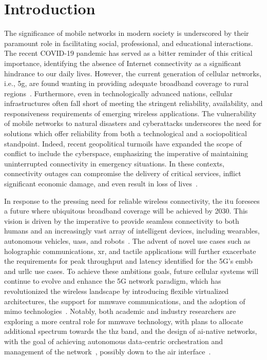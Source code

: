 \chapter{Introduction}

The significance of mobile networks in modern society is underscored by their paramount role in facilitating social, professional, and educational interactions. The recent COVID-19 pandemic has served as a bitter reminder of this critical importance, identifying the absence of Internet connectivity as a significant hindrance to our daily lives.
However, the current generation of cellular networks, i.e., \gls{5g}, are found wanting in providing adequate broadband coverage to rural regions~\cite{yaacoub2020key}. Furthermore, even in technologically advanced nations, cellular infrastructures often fall short of meeting the stringent reliability, availability, and responsiveness requirements of emerging wireless applications. The vulnerability of mobile networks to natural disasters and cyberattacks underscores the need for solutions which offer reliability from both a technological and a sociopolitical standpoint.
Indeed, recent geopolitical turmoils have expanded the scope of conflict to include the cyberspace, emphasizing the imperative of maintaining uninterrupted connectivity in emergency situations. In these contexts, connectivity outages can compromise the delivery of critical services, inflict significant economic damage, and even result in loss of lives~\cite{internet_ukr_afg}.

In response to the pressing need for reliable wireless connectivity, the \gls{itu} foresees a future where ubiquitous broadband coverage will be achieved by 2030. This vision is driven by the imperative to provide seamless connectivity to both humans and an increasingly vast array of intelligent devices, including wearables, autonomous vehicles, \glspl{uas}, and robots~\cite{mozaffari2018beyond}.
The advent of novel use cases such as holographic communications, \gls{xr}, and tactile applications will further exacerbate the requirements for peak throughput and latency identified for the 5G's \gls{embb} and \gls{urllc} use cases. 
To achieve these ambitions goals, future cellular systems will continue to evolve and enhance the 5G network paradigm, which has revolutionized the wireless landscape by introducing flexible virtualized architectures, the support for \gls{mmwave} communications, and the adoption of \gls{mimo} technologies~\cite{ghosh20195g}. 
Notably, both academic and industry researchers are exploring a more central role for \gls{mmwave} technology, with plans to allocate additional spectrum towards the \gls{thz} band, and the design of \gls{ai}-native networks, with the goal of achieving autonomous data-centric orchestration and management of the network~\cite{polese20216g}, possibly down to the air interface~\cite{hoydis2021toward}.

